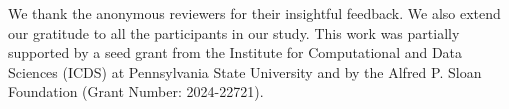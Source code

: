 We thank the anonymous reviewers for their insightful feedback. 
We also extend our gratitude to all the participants in our study. 
This work was partially supported by a seed grant from the Institute for Computational and Data Sciences (ICDS) at Pennsylvania State University and by the Alfred P. Sloan Foundation (Grant Number: 2024-22721).



